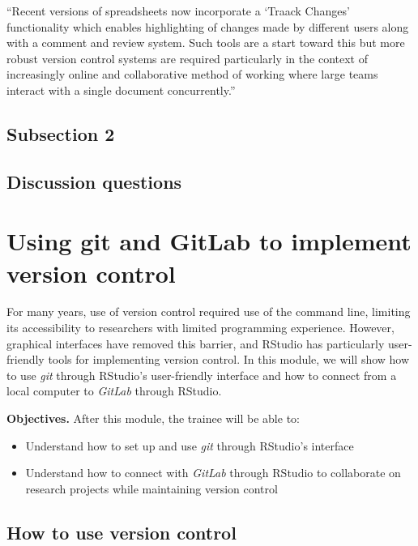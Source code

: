 \documentclass[]{tufte-book}
\providecommand{\tightlist}{%
  \setlength{\itemsep}{0pt}\setlength{\parskip}{0pt}}
\begin{document}
``Recent versions of spreadsheets now incorporate a `Traack Changes' functionality
which enables highlighting of changes made by different users along with a comment
and review system. Such tools are a start toward this but more robust version control
systems are required particularly in the context of increasingly online and
collaborative method of working where large teams interact with a single document
concurrently.'' \citep{birch2018future}

\hypertarget{subsection-2}{%
\subsection{Subsection 2}\label{subsection-2}}

\hypertarget{discussion-questions}{%
\subsection{Discussion questions}\label{discussion-questions}}

\hypertarget{using-git-and-gitlab-to-implement-version-control}{%
\section{Using git and GitLab to implement version control}\label{using-git-and-gitlab-to-implement-version-control}}

For many years, use of version control required use of the command line,
limiting its accessibility to researchers with limited programming experience.
However, graphical interfaces have removed this barrier, and RStudio has
particularly user-friendly tools for implementing version control. In this
module, we will show how to use \emph{git} through RStudio's user-friendly
interface and how to connect from a local computer to \emph{GitLab} through
RStudio.

\textbf{Objectives.} After this module, the trainee will be able to:

\begin{itemize}
\tightlist
\item
  Understand how to set up and use \emph{git} through RStudio's interface
\item
  Understand how to connect with \emph{GitLab} through RStudio to collaborate on\\
  research projects while maintaining version control
\end{itemize}

\hypertarget{how-to-use-version-control}{%
\subsection{How to use version control}\label{how-to-use-version-control}}
\end{document}
